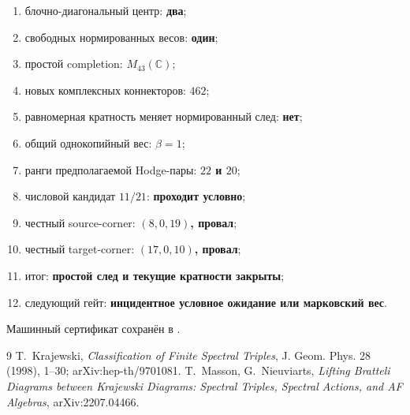 \begin{protocol}
\begin{enumerate}
 \item блочно-диагональный центр: \textbf{два};
 \item свободных нормированных весов: \textbf{один};
 \item простой completion: \textbf{$M_{43}(\mathbb C)$};
 \item новых комплексных коннекторов: \textbf{$462$};
 \item равномерная кратность меняет нормированный след: \textbf{нет};
 \item общий однокопийный вес: \textbf{$\beta=1$};
 \item ранги предполагаемой Hodge-пары: \textbf{$22$ и $20$};
 \item числовой кандидат $11/21$: \textbf{проходит условно};
 \item честный source-corner: \textbf{$(8,0,19)$, провал};
 \item честный target-corner: \textbf{$(17,0,10)$, провал};
 \item итог: \textbf{простой след и текущие кратности закрыты};
 \item следующий гейт: \textbf{инцидентное условное ожидание или марковский вес}.
\end{enumerate}
\end{protocol}

Машинный сертификат сохранён в
.

\begin{thebibliography}{9}
T.~Krajewski,
\emph{Classification of Finite Spectral Triples},
J. Geom. Phys. 28 (1998), 1--30; arXiv:hep-th/9701081.
T.~Masson, G.~Nieuviarts,
\emph{Lifting Bratteli Diagrams between Krajewski Diagrams: Spectral
Triples, Spectral Actions, and AF Algebras}, arXiv:2207.04466.
\end{thebibliography}